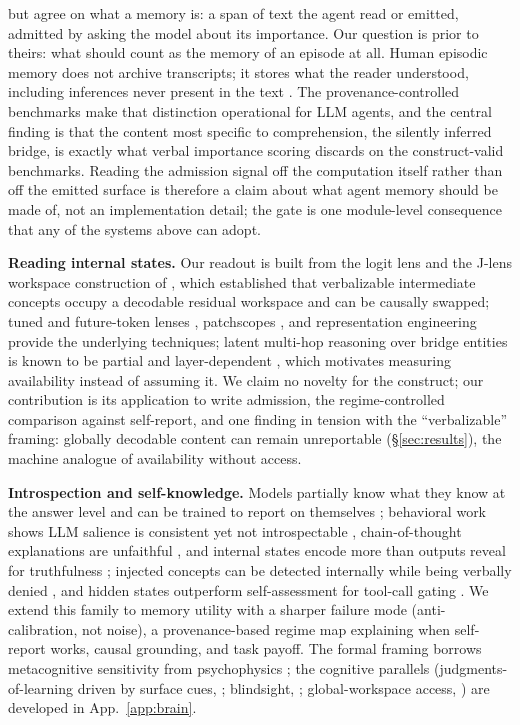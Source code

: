 but agree on what a memory is: a span of text the agent read or emitted,
admitted by asking the model about its importance. Our question is prior to
theirs: what should count as the memory of an episode at all. Human episodic
memory does not archive transcripts; it stores what the reader understood,
including inferences never present in the text
\citep{bartlett1932remembering,reyna1995fuzzy}. The provenance-controlled
benchmarks make that distinction operational for LLM agents, and the central
finding is that the content most specific to comprehension, the silently
inferred bridge, is exactly what verbal importance scoring discards on the
construct-valid benchmarks. Reading
the admission signal off the computation itself rather than off the emitted
surface is therefore a claim about what agent memory should be made of, not
an implementation detail; the gate is one module-level consequence that any
of the systems above can adopt.

\textbf{Reading internal states.}
Our readout is built from the logit lens \citep{nostalgebraist2020logitlens} and
the J-lens workspace construction of \citet{anthropic2026workspace}, which
established that verbalizable intermediate concepts occupy a decodable residual
workspace and can be causally swapped; tuned and future-token lenses
\citep{belrose2023tuned,pal2023futurelens}, patchscopes
\citep{ghandeharioun2024patchscopes}, and representation engineering
\citep{zou2023repe} provide the underlying techniques; latent multi-hop
reasoning over bridge entities is known to be partial and layer-dependent
\citep{yang2024latent,biran2024hopping}, which motivates measuring
availability instead of assuming it. We claim no novelty for the
construct; our contribution is its application to write admission, the
regime-controlled comparison against self-report, and one finding in tension with
the ``verbalizable'' framing: globally decodable content can remain unreportable
(\S\ref{sec:results}), the machine analogue of availability without access.

\textbf{Introspection and self-knowledge.}
Models partially know what they know at the answer level
\citep{kadavath2022know,azaria2023internal} and can be trained to report on
themselves \citep{binder2024introspection}; behavioral work shows LLM salience
is consistent yet not introspectable \citep{trienes2025salience}, chain-of-thought explanations are unfaithful
\citep{turpin2023cot}, and internal states encode more than outputs reveal for
truthfulness \citep{orgad2024llmsknow}; injected concepts can be detected
internally while being verbally denied \citep{lindsey2025introspection,
latentintrospection2026}, and hidden
states outperform self-assessment for tool-call gating \citep{toolcalling2026}. We
extend this family to memory utility with a sharper failure mode
(anti-calibration, not noise), a provenance-based regime map explaining when
self-report works, causal grounding, and task payoff. The formal framing borrows
metacognitive sensitivity from psychophysics \citep{fleming2014how,nelson1990}; the
cognitive parallels (judgments-of-learning driven by surface cues,
\citealp{koriat1997}; blindsight, \citealp{weiskrantz1986}; global-workspace
access, \citealp{dehaene2011}) are developed in App.~\ref{app:brain}.
